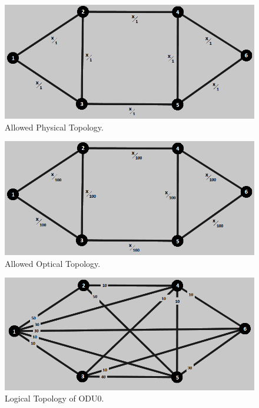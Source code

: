 \begin{figure}[H]
\centering
\includegraphics[width=13cm]{sdf/heuristic/figures/topologies/opaque_surv/medium/allowed_physical_medium}
\caption{Allowed Physical Topology.}
\label{allowed_physical_surv_ref_medium_heuristic}
\end{figure}

\begin{figure}[H]
\centering
\includegraphics[width=13cm]{sdf/heuristic/figures/topologies/opaque_surv/medium/allowed_optical_medium}
\caption{Allowed Optical Topology.}
\label{allowed_optical_surv_ref_medium_heuristic}
\end{figure}

\begin{figure}[H]
\centering
\includegraphics[width=13cm]{sdf/heuristic/figures/topologies/opaque_surv/medium/logical_topology_odu0_medium}
\caption{Logical Topology of ODU0.}
\label{logical_ODU0_surv_ref_medium_heuristic}
\end{figure}

